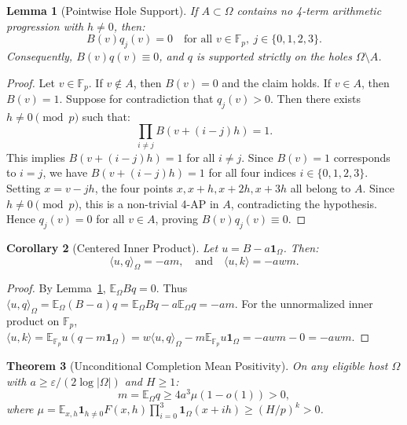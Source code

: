 \documentclass[11pt,reqno]{amsart}
\theoremstyle{plain}
\newtheorem{theorem}{Theorem}[section]
\newtheorem{lemma}[theorem]{Lemma}
\newtheorem{corollary}[theorem]{Corollary}
\theoremstyle{definition}
\newcommand{\F}{\mathbb{F}}
\newcommand{\E}{\mathbb{E}}
\newcommand{\eps}{\varepsilon}
\newcommand{\one}{\mathbf{1}}
\begin{document}
\begin{lemma}[Pointwise Hole Support]\label{lem:hole_support}
If $A \subset \Omega$ contains no 4-term arithmetic progression with $h \ne 0$, then:
\begin{equation}
B(v) q_j(v) = 0 \quad \text{for all } v \in \F_p, \ j \in \{0, 1, 2, 3\}.
\end{equation}
Consequently, $B(v) q(v) \equiv 0$, and $q$ is supported strictly on the holes $\Omega \setminus A$.
\end{lemma}

\begin{proof}
Let $v \in \F_p$. If $v \notin A$, then $B(v) = 0$ and the claim holds.
If $v \in A$, then $B(v) = 1$.
Suppose for contradiction that $q_j(v) > 0$. Then there exists $h \ne 0 \pmod p$ such that:
\begin{equation}
\prod_{i \ne j} B(v + (i - j)h) = 1.
\end{equation}
This implies $B(v + (i - j)h) = 1$ for all $i \ne j$.
Since $B(v) = 1$ corresponds to $i = j$, we have $B(v + (i - j)h) = 1$ for all four indices $i \in \{0, 1, 2, 3\}$.
Setting $x = v - jh$, the four points $x, x+h, x+2h, x+3h$ all belong to $A$.
Since $h \ne 0 \pmod p$, this is a non-trivial 4-AP in $A$, contradicting the hypothesis.
Hence $q_j(v) = 0$ for all $v \in A$, proving $B(v) q_j(v) \equiv 0$.
\end{proof}

\begin{corollary}[Centered Inner Product]\label{cor:inner_prod}
Let $u = B - a \one_\Omega$. Then:
\begin{equation}
\langle u, q \rangle_\Omega = - a m, \quad \text{and} \quad \langle u, k \rangle = - a w m.
\end{equation}
\end{corollary}

\begin{proof}
By Lemma~\ref{lem:hole_support}, $\E_\Omega B q = 0$.
Thus $\langle u, q \rangle_\Omega = \E_\Omega (B - a) q = \E_\Omega B q - a \E_\Omega q = - a m$.
For the unnormalized inner product on $\F_p$, $\langle u, k \rangle = \E_{\F_p} u (q - m \one_\Omega) = w \langle u, q \rangle_\Omega - m \E_{\F_p} u \one_\Omega = - a w m - 0 = - a w m$.
\end{proof}

\begin{theorem}[Unconditional Completion Mean Positivity]\label{thm:mean_positivity}
On any eligible host $\Omega$ with $a \ge \eps / (2\log|\Omega|)$ and $H \ge 1$:
\begin{equation}
m = \E_\Omega q \ge 4 a^3 \mu (1 - o(1)) > 0,
\end{equation}
where $\mu = \E_{x, h} \one_{h \ne 0} F(x, h) \prod_{i=0}^3 \one_\Omega(x + ih) \ge (H/p)^k > 0$.
\end{theorem}
\end{document}
